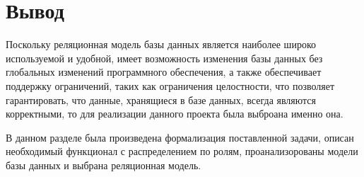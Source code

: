 \section*{Вывод}

Поскольку реляционная модель базы данных является наиболее широко используемой и удобной, имеет возможность изменения базы данных без глобальных изменений программного обеспечения, а также обеспечивает поддержку ограничений, таких как ограничения целостности, что позволяет гарантировать, что данные, хранящиеся в базе данных, всегда являются корректными, то для реализации данного проекта была выброана именно она.

В данном разделе была произведена формализация поставленной задачи, описан необходимый функционал с распределением по ролям, проанализорованы модели базы данных и выбрана реляционная модель.